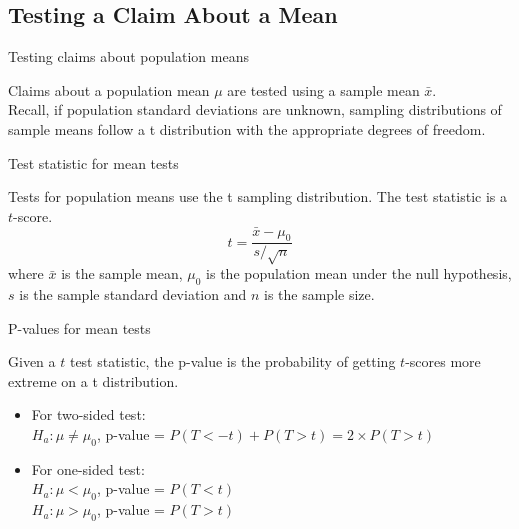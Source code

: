 \documentclass[xcolor=table]{beamer}
\begin{document}
\subsection{Testing a Claim About a Mean}

\begin{frame}{Testing claims about population means}
\begin{block}{}
\large
Claims about a population mean $\mu$ are tested using a sample mean $\bar x$.\\
\medskip
Recall, if population standard deviations are unknown, sampling distributions of sample means follow a t distribution with the appropriate degrees of freedom.\\
\end{block}
\end{frame}

\begin{frame}{Test statistic for mean tests}
\begin{block}{}
\large
Tests for population means use the t sampling distribution. The test statistic is a $t$-score.
\[t = \frac {\bar x - \mu_0}{s/\sqrt{n}}\]
where $\bar x$ is the sample mean, $\mu_0$ is the population mean under the null hypothesis, $s$ is the sample standard deviation and $n$ is the sample size.
\end{block}

\end{frame}


\begin{frame}{P-values for mean tests}
\begin{block}{}
\large
Given a $t$ test statistic, the p-value is the probability of getting $t$-scores more extreme on a t distribution.
\begin{itemize}
\pause\item For two-sided test:\\ 
$H_a: \mu \ne \mu_0$, p-value = $P(T<-t) + P(T > t) = 2 \times P(T > t)$
\pause\item For one-sided test:\\
$H_a: \mu < \mu_0$, p-value = $P(T < t)$\\
$H_a: \mu > \mu_0$, p-value = $P(T > t)$
\end{itemize}
\end{block}
\end{frame}
\end{document}
